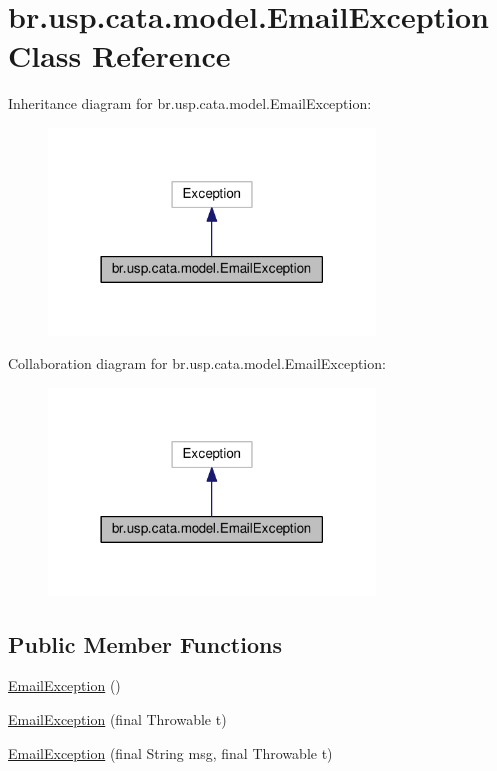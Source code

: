 \hypertarget{classbr_1_1usp_1_1cata_1_1model_1_1_email_exception}{\section{br.\+usp.\+cata.\+model.\+Email\+Exception Class Reference}
\label{classbr_1_1usp_1_1cata_1_1model_1_1_email_exception}
}


Inheritance diagram for br.\+usp.\+cata.\+model.\+Email\+Exception\+:\nopagebreak
\begin{figure}[H]
\begin{center}
\leavevmode
\includegraphics[width=246pt]{classbr_1_1usp_1_1cata_1_1model_1_1_email_exception__inherit__graph}
\end{center}
\end{figure}


Collaboration diagram for br.\+usp.\+cata.\+model.\+Email\+Exception\+:\nopagebreak
\begin{figure}[H]
\begin{center}
\leavevmode
\includegraphics[width=246pt]{classbr_1_1usp_1_1cata_1_1model_1_1_email_exception__coll__graph}
\end{center}
\end{figure}
\subsection*{Public Member Functions}
\begin{DoxyCompactItemize}
\item 
\hyperlink{classbr_1_1usp_1_1cata_1_1model_1_1_email_exception_aa3d864ba112733b595aaab6a4090ac4c}{Email\+Exception} ()
\item 
\hyperlink{classbr_1_1usp_1_1cata_1_1model_1_1_email_exception_a4aadfd2d2f5323aaf5610600efc3ad30}{Email\+Exception} (final Throwable t)
\item 
\hyperlink{classbr_1_1usp_1_1cata_1_1model_1_1_email_exception_a5f3523f26621bb170dcb631b34bd8f94}{Email\+Exception} (final String msg, final Throwable t)
\end{DoxyCompactItemize}
